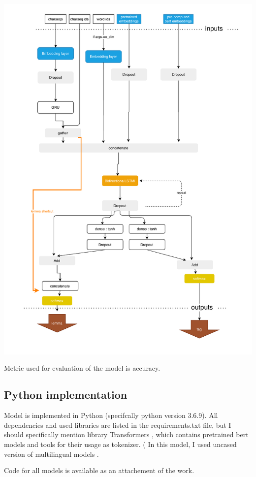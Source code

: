 \centering
\includegraphics[width=\columnwidth]{../img/taggermodel.pdf}

Metric used for evaluation of the model is accuracy.
\subsection{Python implementation}
Model is implemented in Python (specifcally python version 3.6.9). All dependencies and used libraries are listed in the requirements.txt file,  %
but I should specifically mention library Transformers %
, which contains pretrained bert models and tools for their usage as tokenizer. (%
In this model, I used uncased version of multilingual models %
.

Code for all models is available as an attachement of the work.




